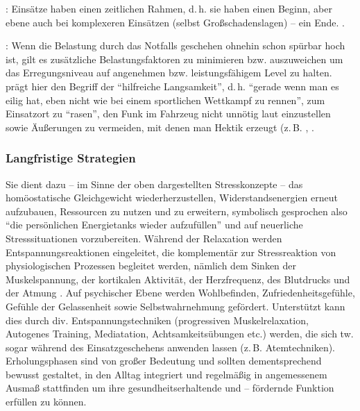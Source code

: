 : Einsätze haben einen
zeitlichen Rahmen, d.\,h. sie haben einen Beginn, aber ebene
auch bei komplexeren Einsätzen (selbst Großschadenslagen) –
ein Ende.  \cite{Karutz200912}.

: Wenn die Belastung durch
das Notfalls geschehen ohnehin schon spürbar hoch ist, gilt
es zusätzliche Belastungsfaktoren zu minimieren bzw.
auszuweichen um das Erregungsniveau auf angenehmen bzw.
leistungsfähigem Level zu halten. 
\cite{Karutz200912} prägt hier den Begriff der \enquote{hilfreiche Langsamkeit}, d.\,h. \enquote{gerade wenn
man es eilig hat, eben nicht wie bei einem sportlichen
Wettkampf zu rennen}, zum Einsatzort zu \enquote{rasen}, den Funk im
Fahrzeug nicht unnötig laut einzustellen sowie Äußerungen zu
vermeiden, mit denen man Hektik erzeugt (z.\,B.
, .

\subsubsection{Langfristige Strategien}

{Sie dient dazu -- im Sinne der oben
dargestellten Stresskonzepte -- das homöostatische
Gleichgewicht wiederherzustellen, Widerstandsenergien erneut
aufzubauen, Ressourcen zu nutzen und zu erweitern,
symbolisch gesprochen also \enquote{die persönlichen Energietanks
wieder aufzufüllen} und auf neuerliche Stresssituationen
vorzubereiten. Während der Relaxation werden
Entspannungsreaktionen eingeleitet, die komplementär zur
Stressreaktion von physiologischen Prozessen begleitet
werden, nämlich dem Sinken der Muskelspannung, der
kortikalen Aktivität, der Herzfrequenz, des Blutdrucks und
der Atmung \cite{ZimbardoPsych6}. Auf
psychischer Ebene werden Wohlbefinden, Zufriedenheitsgefühle, Gefühle der
Gelassenheit sowie Selbstwahrnehmung gefördert. Unterstützt
kann dies durch div. Entspannungstechniken (progressiven
Muskelrelaxation, Autogenes Training, Mediatation,
Achtsamkeitsübungen etc.) werden, die sich tw. sogar während
des Einsatzgeschehens anwenden lassen (z.\,B.
Atemtechniken). Erholungsphasen sind von großer Bedeutung
und sollten dementsprechend bewusst gestaltet, in den Alltag
integriert und regelmäßig in angemessenem Ausmaß stattfinden
um ihre gesundheitserhaltende und -- fördernde Funktion
erfüllen zu können.}
{}
{}
{}
{}

